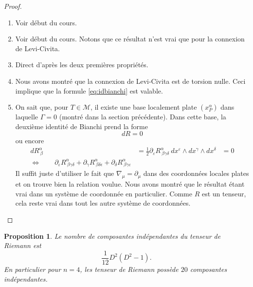 \documentclass[a4paper,11pt]{report}
\theoremstyle{definition}
\theoremstyle{plain}
\newtheorem{prop}[thm]{Proposition}
\theoremstyle{definition}
\theoremstyle{remark}
\newcommand{\M}{\mathscr{M}}
\newcommand{\p}{\partial}
\begin{document}
                \begin{proof}${}$\\
                    \begin{enumerate}[label = \textit{\roman*)}]
                        \item Voir début du cours.
                        \item Voir début du cours. Notons que ce résultat n'est vrai que pour la connexion de Levi-Civita.
                        \item Direct d'après les deux premières propriétés.
                        \item Nous avons montré que la connexion de Levi-Civita est de torsion nulle. Ceci implique que la formule \ref{eq:idbianchi} est valable.
                        \item On sait que, pour $T\in\M$, il existe une base localement plate $(x^\alpha_P)$ dans laquelle $\Gamma = 0$ (montré dans la section précédente). Dans cette base, la deuxième identité de Bianchi prend la forme
                        \begin{equation}
                            dR = 0
                        \end{equation}
                        ou encore
                        \begin{align}
                            dR^\alpha_{~\beta} &= \frac{1}{2} \p_\varepsilon R^\alpha_{~\beta\gamma\delta}~dx^\varepsilon\wedge dx^\gamma\wedge dx^\delta &= 0\\
                            \Leftrightarrow\qquad \p_\varepsilon R^\alpha_{~\beta\gamma\delta} + \p_\gamma R^\alpha_{~\beta\delta\epsilon} + \p_\delta R^\alpha_{~\beta\gamma\varepsilon}
                        \end{align}
                        Il suffit juste d'utiliser le fait que $\nabla_\mu = \p_\mu$ dans des coordonnées locales plates et on trouve bien la relation voulue. Nous avons montré que le résultat étant vrai dans un système de coordonnée en particulier. Comme $R$ est un tenseur, cela reste vrai dans tout les autre système de coordonnées.
                    \end{enumerate}
                \end{proof}
                
                \begin{prop}
                    Le nombre de composantes indépendantes du tenseur de Riemann est
                    \begin{equation}
                        \frac{1}{12}D^2(D^2-1).
                    \end{equation}
                    En particulier pour $n=4$, les tenseur de Riemann possède $20$ composantes indépendantes.
                \end{prop}
                
\end{document}
